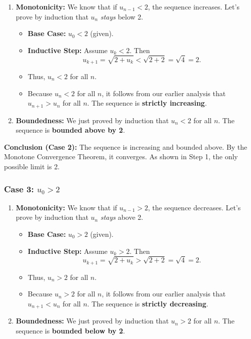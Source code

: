 \documentclass[12pt,a4paper]{article}
\theoremstyle{definition}
\begin{document}
\begin{enumerate}[label=\alph*)]
    \item \textbf{Monotonicity:} We know that if $u_{n-1} < 2$, the sequence increases. Let's prove by induction that $u_n$ \textit{stays} below 2.
    \begin{itemize}
        \item \textbf{Base Case:} $u_0 < 2$ (given).
        \item \textbf{Inductive Step:} Assume $u_k < 2$. Then 
        \[
        u_{k+1} = \sqrt{2 + u_k} < \sqrt{2 + 2} = \sqrt{4} = 2.
        \]
        \item Thus, $u_n < 2$ for all $n$.
        \item Because $u_n < 2$ for all $n$, it follows from our earlier analysis that $u_{n+1} > u_n$ for all $n$. The sequence is \textbf{strictly increasing}.
    \end{itemize}
    
    \item \textbf{Boundedness:} We just proved by induction that $u_n < 2$ for all $n$. The sequence is \textbf{bounded above by 2}.
\end{enumerate}

\textbf{Conclusion (Case 2):} The sequence is increasing and bounded above. By the Monotone Convergence Theorem, it converges. As shown in Step 1, the only possible limit is 2.

\subsubsection{Case 3: $u_0 > 2$}

\begin{enumerate}[label=\alph*)]
    \item \textbf{Monotonicity:} We know that if $u_{n-1} > 2$, the sequence decreases. Let's prove by induction that $u_n$ \textit{stays} above 2.
    \begin{itemize}
        \item \textbf{Base Case:} $u_0 > 2$ (given).
        \item \textbf{Inductive Step:} Assume $u_k > 2$. Then 
        \[
        u_{k+1} = \sqrt{2 + u_k} > \sqrt{2 + 2} = \sqrt{4} = 2.
        \]
        \item Thus, $u_n > 2$ for all $n$.
        \item Because $u_n > 2$ for all $n$, it follows from our earlier analysis that $u_{n+1} < u_n$ for all $n$. The sequence is \textbf{strictly decreasing}.
    \end{itemize}
    
    \item \textbf{Boundedness:} We just proved by induction that $u_n > 2$ for all $n$. The sequence is \textbf{bounded below by 2}.
\end{enumerate}
\end{document}
